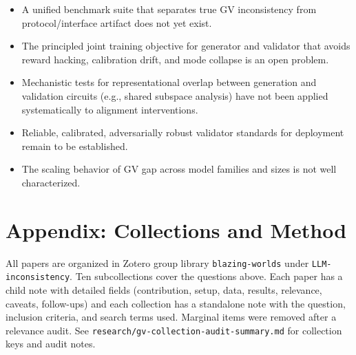 \documentclass[11pt]{article}
\begin{document}
\begin{itemize}
  \item A unified benchmark suite that separates true GV inconsistency from protocol/interface artifact does not yet exist.
  \item The principled joint training objective for generator and validator that avoids reward hacking, calibration drift, and mode collapse is an open problem.
  \item Mechanistic tests for representational overlap between generation and validation circuits (e.g., shared subspace analysis) have not been applied systematically to alignment interventions.
  \item Reliable, calibrated, adversarially robust validator standards for deployment remain to be established.
  \item The scaling behavior of GV gap across model families and sizes is not well characterized.
\end{itemize}

\section*{Appendix: Collections and Method}

All papers are organized in Zotero group library \texttt{blazing-worlds} under \texttt{LLM-inconsistency}. Ten subcollections cover the questions above. Each paper has a child note with detailed fields (contribution, setup, data, results, relevance, caveats, follow-ups) and each collection has a standalone note with the question, inclusion criteria, and search terms used. Marginal items were removed after a relevance audit. See \texttt{research/gv-collection-audit-summary.md} for collection keys and audit notes.
\end{document}
